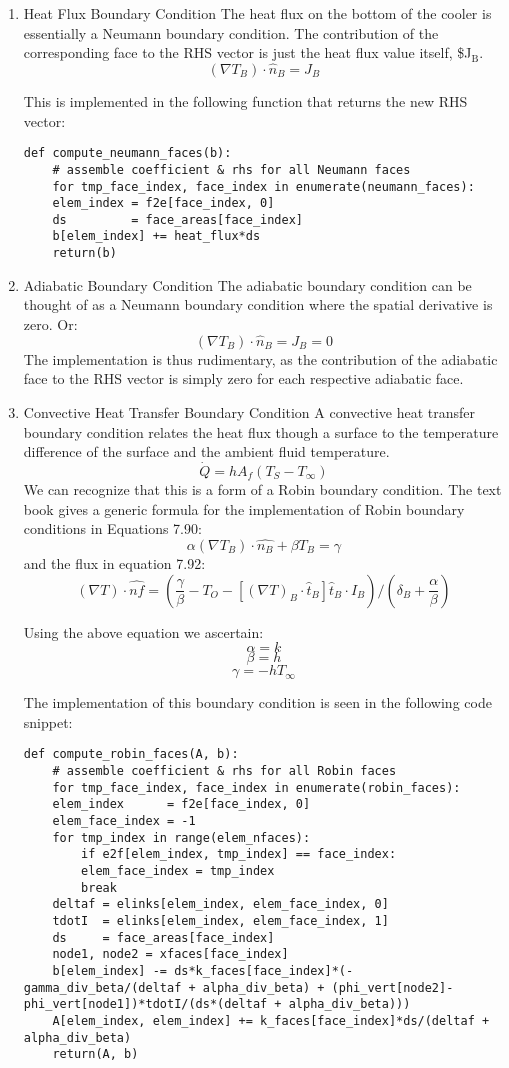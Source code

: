 \documentclass[11pt]{article}
\begin{document}
\begin{enumerate}
\item Heat Flux Boundary Condition
\label{sec:org101599d}
The heat flux on the bottom of the cooler is essentially a Neumann boundary condition. The contribution of the corresponding face to the RHS vector is just the heat flux value itself, \$J\(_{\text{B}}\). 
\[
 (\nabla T_{B} ) \cdot \hat{n}_{B} = J_{B}
 \]

This is implemented in the following function that returns the new RHS vector:
\begin{verbatim}
def compute_neumann_faces(b):
    # assemble coefficient & rhs for all Neumann faces
    for tmp_face_index, face_index in enumerate(neumann_faces):
	elem_index = f2e[face_index, 0]
	ds         = face_areas[face_index]
	b[elem_index] += heat_flux*ds
    return(b)
\end{verbatim}
\item Adiabatic Boundary Condition
\label{sec:org25650c9}
The adiabatic boundary condition can be thought of as a Neumann boundary condition where the spatial derivative is zero. Or:
\[
 (\nabla T_{B} ) \cdot \hat{n}_{B} = J_{B} = 0
 \]
The implementation is thus rudimentary, as the contribution of the adiabatic face to the RHS vector is simply zero for each respective adiabatic face.
\item Convective Heat Transfer Boundary Condition
\label{sec:orge7bf8d1}
A convective heat transfer boundary condition relates the heat flux though a surface to the temperature difference of the surface and the ambient fluid temperature.
\[
 \dot{Q} = hA_{f}(T_{S}-T_{\infty})
 \]
We can recognize that this is a form of a Robin boundary condition. The text book gives a generic formula for the implementation of Robin boundary conditions in Equations 7.90:
\[
 \alpha ( \nabla T_{B}) \cdot \hat{n_{B}} + \beta T_{B} = \gamma 
 \] 
and the flux in equation 7.92:
\[
 ( \nabla T ) \cdot \hat{nf} =  \left( \frac{\gamma}{\beta} -T_{O} - [(\nabla T)_{B} \cdot \hat{t}_{B}] \hat{t}_{B} \cdot I_{B} \right) / \left( \delta_{B} + \frac{\alpha}{\beta} \right)
 \]

Using the above equation we ascertain:
\[ \alpha = k\] 
\[ \beta = h \] 
\[ \gamma = -h T_{\infty} \] 

The implementation of this boundary condition is seen in the following code snippet:
\begin{verbatim}
def compute_robin_faces(A, b):
    # assemble coefficient & rhs for all Robin faces
    for tmp_face_index, face_index in enumerate(robin_faces):
	elem_index      = f2e[face_index, 0]
	elem_face_index = -1
	for tmp_index in range(elem_nfaces):
	    if e2f[elem_index, tmp_index] == face_index:
		elem_face_index = tmp_index
		break
	deltaf = elinks[elem_index, elem_face_index, 0]
	tdotI  = elinks[elem_index, elem_face_index, 1]
	ds     = face_areas[face_index]
	node1, node2 = xfaces[face_index]
	b[elem_index] -= ds*k_faces[face_index]*(-gamma_div_beta/(deltaf + alpha_div_beta) + (phi_vert[node2]-phi_vert[node1])*tdotI/(ds*(deltaf + alpha_div_beta)))
	A[elem_index, elem_index] += k_faces[face_index]*ds/(deltaf + alpha_div_beta)
    return(A, b)
\end{verbatim}
\end{enumerate}
\end{document}

